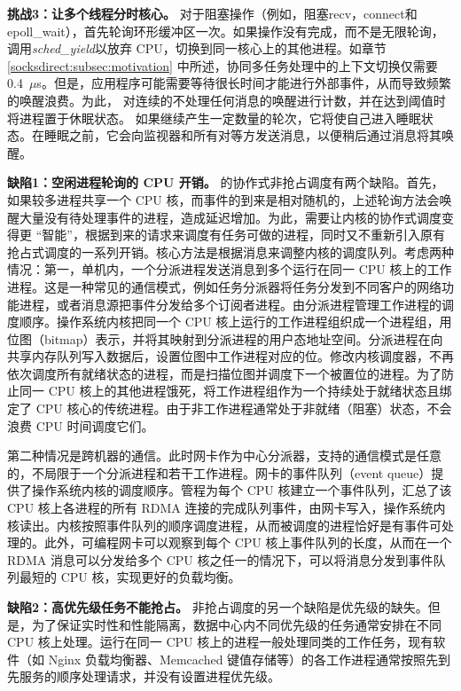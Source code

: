 \textbf {挑战3：让多个线程分时核心。}
对于阻塞操作（例如，阻塞recv，connect和epoll\_wait），\libipc {}首先轮询环形缓冲区一次。如果操作没有完成，而不是无限轮询，\libipc {}调用\textit {sched\_yield}以放弃 CPU，切换到同一核心上的其他进程。如章节 \ref {socksdirect:subsec:motivation} 中所述，协同多任务处理中的上下文切换仅需要0.4~$\mu$s。但是，应用程序可能需要等待很长时间才能进行外部事件，从而导致频繁的唤醒浪费。为此，\libipc{} 对连续的不处理任何消息的唤醒进行计数，并在达到阈值时将进程置于休眠状态。
如果\libipc {}继续产生一定数量的轮次，它将使自己进入睡眠状态。在睡眠之前，它会向监视器和所有对等方发送消息，以便稍后通过消息将其唤醒。

\textbf{缺陷1：空闲进程轮询的 CPU 开销。}
\libipc{} 的协作式非抢占调度有两个缺陷。首先，如果较多进程共享一个 CPU 核，而事件的到来是相对随机的，上述轮询方法会唤醒大量没有待处理事件的进程，造成延迟增加。为此，需要让内核的协作式调度变得更 ``智能''，根据到来的请求来调度有任务可做的进程，同时又不重新引入原有抢占式调度的一系列开销。核心方法是根据消息来调整内核的调度队列。考虑两种情况：第一，单机内，一个分派进程发送消息到多个运行在同一 CPU 核上的工作进程。这是一种常见的通信模式，例如任务分派器将任务分发到不同客户的网络功能进程，或者消息源把事件分发给多个订阅者进程。由分派进程管理工作进程的调度顺序。操作系统内核把同一个 CPU 核上运行的工作进程组织成一个进程组，用位图（bitmap）表示，并将其映射到分派进程的用户态地址空间。分派进程在向共享内存队列写入数据后，设置位图中工作进程对应的位。修改内核调度器，不再依次调度所有就绪状态的进程，而是扫描位图并调度下一个被置位的进程。为了防止同一 CPU 核上的其他进程饿死，将工作进程组作为一个持续处于就绪状态且绑定了 CPU 核心的传统进程。由于非工作进程通常处于非就绪（阻塞）状态，不会浪费 CPU 时间调度它们。

第二种情况是跨机器的通信。此时网卡作为中心分派器，支持的通信模式是任意的，不局限于一个分派进程和若干工作进程。网卡的事件队列（event queue）提供了操作系统内核的调度顺序。管程为每个 CPU 核建立一个事件队列，汇总了该 CPU 核上各进程的所有 RDMA 连接的完成队列事件，由网卡写入，操作系统内核读出。内核按照事件队列的顺序调度进程，从而被调度的进程恰好是有事件可处理的。此外，可编程网卡可以观察到每个 CPU 核上事件队列的长度，从而在一个 RDMA 消息可以分发给多个 CPU 核之任一的情况下，可以将消息分发到事件队列最短的 CPU 核，实现更好的负载均衡。

\textbf{缺陷2：高优先级任务不能抢占。}
非抢占调度的另一个缺陷是优先级的缺失。但是，为了保证实时性和性能隔离，数据中心内不同优先级的任务通常安排在不同 CPU 核上处理。运行在同一 CPU 核上的进程一般处理同类的工作任务，现有软件（如 Nginx 负载均衡器、Memcached 键值存储等）的各工作进程通常按照先到先服务的顺序处理请求，并没有设置进程优先级。


